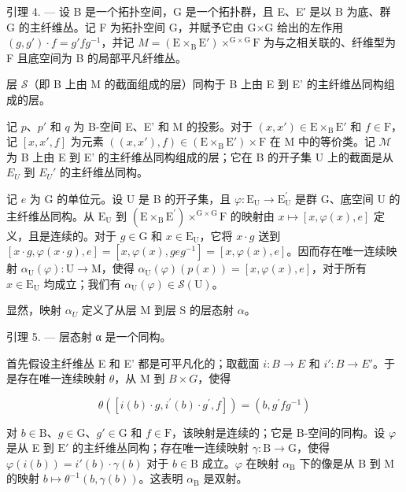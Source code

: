 引理 4. --- 设 B 是一个拓扑空间，G 是一个拓扑群，且 E、E′ 是以 B 为底、群 G 的主纤维丛。记 F 为拓扑空间 G，并赋予它由 G×G 给出的左作用 \((g,g')\cdot f=g'fg^{-1}\)，并记 \(M = (\mathrm{E}\times_{\mathrm{B}}\mathrm{E}')\times^{\mathrm{G}\times\mathrm{G}}\mathrm{F}\) 为与之相关联的、纤维型为 F 且底空间为 B 的局部平凡纤维丛。

层 \(\mathcal{S}\)（即 B 上由 M 的截面组成的层）同构于 B 上由 E 到 E' 的主纤维丛同构组成的层。

记 \(p\)、\(p'\) 和 \(q\) 为 B-空间 E、E' 和 M 的投影。对于 \((x, x') \in \mathrm{E} \times_{\mathrm{B}} \mathrm{E}'\) 和 \(f \in \mathrm{F}\)，记 \([x, x', f]\) 为元素 \(((x, x'), f) \in (\mathrm{E} \times_{\mathrm{B}} \mathrm{E}') \times \mathrm{F}\) 在 M 中的等价类。记 \(\mathcal{M}\) 为 B 上由 E 到 E' 的主纤维丛同构组成的层；它在 B 的开子集 U 上的截面是从 \(E_{U}\) 到 \(E_{U}'\) 的主纤维丛同构。

记 \(e\) 为 G 的单位元。设 U 是 B 的开子集，且 \(\varphi\colon\mathrm{E}_{\mathrm{U}}\to\mathrm{E}_{\mathrm{U}}^{\prime}\) 是群 G、底空间 U 的主纤维丛同构。从 \(\mathrm{E}_{\mathrm{U}}\) 到 \((\mathrm{E}\times_{\mathrm{B}}\mathrm{E}^{\prime})\times^{\mathrm{G}\times\mathrm{G}}\mathrm{F}\) 的映射由 \(x\mapsto[x,\varphi(x),e]\) 定义，且是连续的。对于 \(g\in\mathrm{G}\) 和 \(x\in\mathrm{E}_{\mathrm{U}}\)，它将 \(x\cdot g\) 送到 \([x\cdot g,\varphi(x\cdot g),e]=[x,\varphi(x),geg^{-1}]=[x,\varphi(x),e]\)。因而存在唯一连续映射 \(\alpha_{\mathrm{U}}(\varphi)\colon\mathrm{U}\to\mathrm{M}\)，使得 \(\alpha_{\mathrm{U}}(\varphi)(p(x))=[x,\varphi(x),e]\)，对于所有 \(x\in\mathrm{E}_{\mathrm{U}}\) 均成立；我们有 \(\alpha_{\mathrm{U}}(\varphi)\in\mathcal{S}(\mathrm{U})\)。

显然，映射 \(\alpha_{U}\) 定义了从层 M 到层 S 的层态射 \(\alpha\)。

引理 5. --- 层态射 α 是一个同构。

首先假设主纤维丛 E 和 E' 都是可平凡化的；取截面 \(i: B \to E\) 和 \(i': B \to E'\)。于是存在唯一连续映射 \(\theta\)，从 M 到 \(B \times G\)，使得

\[
\theta ([ i (b) \cdot g, i ^ {\prime} (b) \cdot g ^ {\prime}, f ]) = (b, g ^ {\prime} f g ^ {- 1})
\]

对 \(b \in \mathrm{B}\)、\(g \in \mathrm{G}\)、\(g' \in \mathrm{G}\) 和 \(f \in \mathrm{F}\)，该映射是连续的；它是 B-空间的同构。设 \(\varphi\) 是从 E 到 \(\mathrm{E}'\) 的主纤维丛同构；存在唯一连续映射 \(\gamma: \mathrm{B} \to \mathrm{G}\)，使得 \(\varphi(i(b)) = i'(b) \cdot \gamma(b)\) 对于 \(b \in \mathrm{B}\) 成立。\(\varphi\) 在映射 \(\alpha_{\mathrm{B}}\) 下的像是从 B 到 M 的映射 \(b \mapsto \theta^{-1}(b, \gamma(b))\)。这表明 \(\alpha_{\mathrm{B}}\) 是双射。

